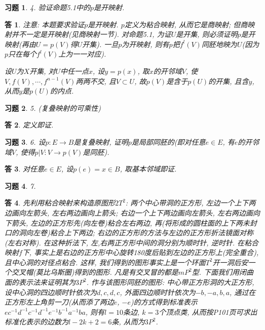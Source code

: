 \documentclass{ctexart}%
\newtheorem*{exercise}{习题}
\newtheorem*{solution}{答}
\theoremstyle{definition}
\theoremstyle{remark}
\begin{document}
\begin{exercise}4. 验证命题5.1中的$p$是开映射.
\end{exercise}
\begin{solution}
注意: 本题要求验证$p$是开映射. $p$定义为粘合映射, 从而它是商映射; 但商映射并不一定是开映射(见商映射一节). 对命题5.1, 为证$U$是开集, 则必须证明$p$是开映射(再由$U=p(V)$得$U$开集). 一旦$p$为开映射, 则有$p$把$f^l(V)$同胚地映为$U$(因为$p$只在每个$f^l(V)$上为一一对应). 

设$U$为$X$开集, 对$U$中任一点$x$, 设$y=p(x)$, 取$x$的开邻域$V$, 使$V,f(V),\cdots,f^{n-1}(V)$两两不交, 且$V\subset U$, 故$p(V)$是含于$p(U)$的开集, 且含$y$, 从而$y$是$p(U)$的内点. 
\end{solution}

\begin{exercise}5. (复叠映射的可乘性)
\end{exercise}
\begin{solution}
定义即证.
\end{solution}

\begin{exercise}6. 设$p:E\rightarrow B$是复叠映射, 证明$p$是局部同胚的(即对任意$e\in E$, 有$e$的开邻域$V$, 使得$p|V:V\rightarrow p(V)$是同胚).
\end{exercise}
\begin{solution}
对任意$e\in E$, 设$p(e)=x\in B$, 取基本邻域即证. 
\end{solution}

\begin{exercise}7.
\end{exercise}
\begin{solution}
先利用粘合映射来构造原图形$2T^2$: 两个中心带洞的正方形, 左边一个上下两边画向左箭头, 左右两边画向上箭头; 右边一个上下两边画向左箭头, 左右两边画向下箭头, 左边的正方形先(向左卷)粘合左右两边, 再(将形成的圆柱面的上下两未封口的洞向左卷)粘合上下两边; 右边的正方形的方法与左边的正方形折法镜面对称(左右对称). 在这种折法下, 左,右两正方形中间的洞分别为顺时针, 逆时针. 在粘合映射$f$下, 事实上是右边的正方形中心旋转180度后贴到左边的正方形上(完全重合), 且中心洞的对径点粘合. 这样, 我们得到的图形事实上是一个环面$T^2$开一洞后安一个交叉帽(莫比乌斯圈)得到的图形. 凡是有交叉冒的都是$mP^2$型. 下面我们用闭曲面的表示法来证明其为$3P^2$. 作与该图形同胚的图形: 中心带正方形洞的大正方形, 设中心洞的四边顺时针依次为$d,c,d,c$, 外面四边顺时针依次为$-b,-a,b,a$, 通过在正方形左上角剪一刀(从而添了两边$e$, $-e$)的方式得到标准表示$ec^{-1}d^{-1}c^{-1}d^{-1}e^{-1}b^{-1}a^{-1}ba$, 则有$l=10$条边, $k=3$个顶点类, 从而按P101页可求出标准化表示的边数为$l-2k+2=6$条, 从而为$3P^2$.
\end{solution}
\end{document}
